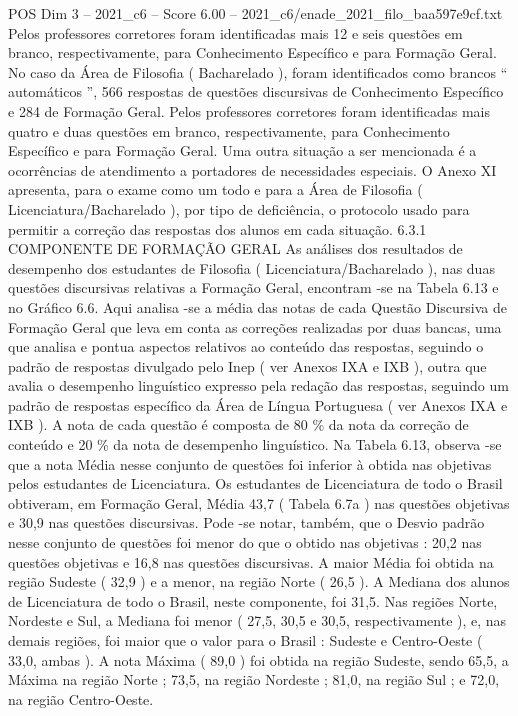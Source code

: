 \begin{textsample}{POS Dim 3 – 2021\_c6 – Score 6.00 – 2021\_c6/enade\_2021\_filo\_baa597e9cf.txt}
Pelos professores corretores foram identificadas mais 12 e seis questões em branco, respectivamente, para Conhecimento Específico e para Formação Geral.
No caso da Área de Filosofia ( Bacharelado ), foram identificados como brancos “ automáticos ”, 566 respostas de questões discursivas de Conhecimento Específico e 284 de Formação Geral.
Pelos professores corretores foram identificadas mais quatro e duas questões em branco, respectivamente, para Conhecimento Específico e para Formação Geral.
Uma outra situação a ser mencionada é a ocorrências de atendimento a portadores de necessidades especiais.
O Anexo XI apresenta, para o exame como um todo e para a Área de Filosofia ( Licenciatura/Bacharelado ), por tipo de deficiência, o protocolo usado para permitir a correção das respostas dos alunos em cada situação. 6.3.1 COMPONENTE DE FORMAÇÃO GERAL As análises dos resultados de desempenho dos estudantes de Filosofia ( Licenciatura/Bacharelado ), nas duas questões discursivas relativas a Formação Geral, encontram -se na Tabela 6.13 e no Gráfico 6.6.
Aqui analisa -se a média das notas de cada Questão Discursiva de Formação Geral que leva em conta as correções realizadas por duas bancas, uma que analisa e pontua aspectos relativos ao conteúdo das respostas, seguindo o padrão de respostas divulgado pelo Inep ( ver Anexos IXA e IXB ), outra que avalia o desempenho linguístico expresso pela redação das respostas, seguindo um padrão de respostas específico da Área de Língua Portuguesa ( ver Anexos IXA e IXB ).
A nota de cada questão é composta de 80 \% da nota da correção de conteúdo e 20 \% da nota de desempenho linguístico.
Na Tabela 6.13, observa -se que a nota Média nesse conjunto de questões foi inferior à obtida nas objetivas pelos estudantes de Licenciatura.
Os estudantes de Licenciatura de todo o Brasil obtiveram, em Formação Geral, Média 43,7 ( Tabela 6.7a ) nas questões objetivas e 30,9 nas questões discursivas.
Pode -se notar, também, que o Desvio padrão nesse conjunto de questões foi menor do que o obtido nas objetivas : 20,2 nas questões objetivas e 16,8 nas questões discursivas.
A maior Média foi obtida na região Sudeste ( 32,9 ) e a menor, na região Norte ( 26,5 ).
A Mediana dos alunos de Licenciatura de todo o Brasil, neste componente, foi 31,5.
Nas regiões Norte, Nordeste e Sul, a Mediana foi menor ( 27,5, 30,5 e 30,5, respectivamente ), e, nas demais regiões, foi maior que o valor para o Brasil : Sudeste e Centro-Oeste ( 33,0, ambas ).
A nota Máxima ( 89,0 ) foi obtida na região Sudeste, sendo 65,5, a Máxima na região Norte ; 73,5, na região Nordeste ; 81,0, na região Sul ; e 72,0, na região Centro-Oeste.

\end{textsample}
